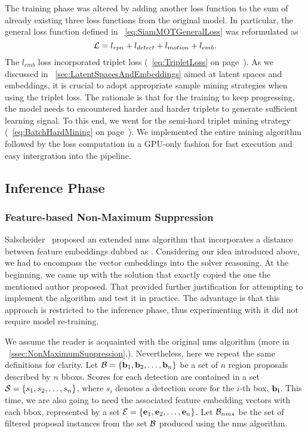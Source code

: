 The training phase was altered by adding another loss function to the sum of already existing three loss functions from the original model. In particular, the general \siammot{} loss function defined in \eqtext{}~\ref{eq:SiamMOTGeneralLoss} was reformulated as
\begin{equation}
    \label{eq:SiamMOTFeatureEmbLoss}
    \mathcal{L} = l_{rpn} + l_{detect} + l_{motion} + l_{emb}.
\end{equation}
The $l_{emb}$ loss incorporated triplet loss (\eqtext{}~\ref{eq:TripletLoss} on page~\pageref{eq:TripletLoss}). As we discussed in \sectiontext{}~\ref{sec:LatentSpacesAndEmbeddings} aimed at latent spaces and embeddings, it is crucial to adopt appropriate sample mining strategies when using the triplet loss. The rationale is that for the training to keep progressing, the model needs to encountered harder and harder triplets to generate sufficient learning signal. To this end, we went for the semi-hard triplet mining strategy (\eqtext{}~\ref{eq:BatchHardMining} on page~\pageref{eq:BatchHardMining}). We implemented the entire mining algorithm followed by the loss computation in a GPU-only fashion for fast execution and easy intergration into the pipeline.

\subsection{Inference Phase}

\subsubsection{Feature-based Non-Maximum Suppression}
\label{sssec:FeatureNonMaximumSuppression}

Salscheider~\cite{salscheider2020featurenms} proposed an extended \gls{nms} algorithm that incorporates a distance between feature embeddings dubbed as \featurenms{}. Considering our idea introduced above, we had to encompass the vector embeddings into the solver reasoning. At the beginning, we came up with the solution that exactly copied the one the mentioned author proposed. That provided further justification for attempting to implement the algorithm and test it in practice. The advantage is that this approach is restricted to the inference phase, thus experimenting with it did not require model re-training.

We assume the reader is acquainted with the original \gls{nms} algorithm (more in \sectiontext{}~\ref{ssec:NonMaximumSuppression}.). Nevertheless, here we repeat the same definitions for clarity. Let $\mathcal{B} = \left\{ {\mathbf{b}_1, \mathbf{b}_2, \dots, \mathbf{b}_n} \right\}$ be a set of $n$ region proposals described by $n$ \glspl{bbox}. Scores for each detection are contained in a set $\mathcal{S} = \left\{ {s_1, s_2, \dots, s_n} \right\}$, where $s_i$ denotes a detection score for the $i$-th box, $\mathbf{b_i}$. This time, we are also going to need the associated feature embedding vectors with each \gls{bbox}, represented by a set $\mathcal{E} = \left\{ {\mathbf{e}_1, \mathbf{e}_2, \dots, \mathbf{e}_n} \right\}$. Let $\mathcal{B}_{nms}$ be  the set of filtered proposal instances from the set $\mathcal{B}$ produced using the \gls{nms} algorithm.

